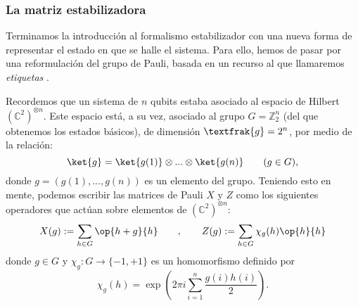 \documentclass[11pt,a4paper,twoside,pdf]{article}
\numberwithin{equation}{section}
\begin{document}
			
			
		\subsubsection{La matriz estabilizadora}
		
		Terminamos la introducción al formalismo estabilizador con una nueva forma de representar el estado en que se halle el sistema. Para ello, hemos de pasar por una reformulación del grupo de Pauli, basada en un recurso al que llamaremos \textit{etiquetas} \cite{Bermejo VandenNest}.
		
		Recordemos que un sistema de $n$ qubits estaba asociado al espacio de Hilbert $\left( \mathbb{C}^2\right) ^{\otimes n}$. Este espacio está, a su vez, asociado al grupo $G=\mathbb{Z}_2^n$ (del que obtenemos los estados básicos), de dimensión $\textfrak{g}=2^n$, por medio de la relación:
		\begin{equation}
			\ket{g} = \ket{g(1)} \otimes ... \otimes \ket{g(n)} \qquad (g \in G),
		\end{equation}
		\noindent donde $g=(g(1),...,g(n))$ es un elemento del grupo. Teniendo esto en mente, podemos escribir las matrices de Pauli $X$ y $Z$ como los siguientes operadores que actúan sobre elementos de $\left( \mathbb{C}^2\right) ^{\otimes n}$:
		\begin{equation}\label{eq: Pauli etiquetas}
			X(g) := \displaystyle\sum_{h \in G} \op{h+g}{h}	\qquad , \qquad Z(g) := \displaystyle\sum_{h \in G} \chi_g(h)\op{h}{h}
		\end{equation}
		donde $g \in G$ y $\chi_g : G \longrightarrow \{-1,+1\}$ es un homomorfismo  definido por
		\begin{equation}\label{eq: character function}
			\chi_g(h) = \exp\left( 2\pi i \displaystyle\sum_{i=1}^n \frac{g(i)h(i)}{2}\right) . 
		\end{equation}
		
\end{document}
